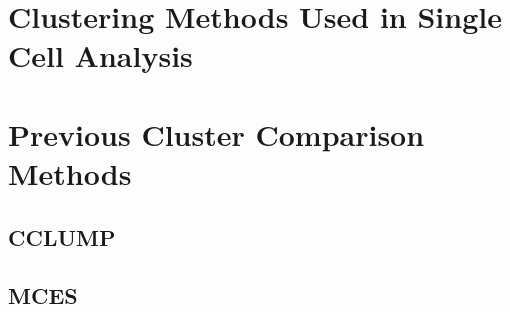 \documentclass[11pt]{article}
\begin{document}
\section{Clustering Methods Used in Single Cell Analysis}


\section{Previous Cluster Comparison Methods}

\subsection{CCLUMP}

\subsection{MCES}
\end{document}
